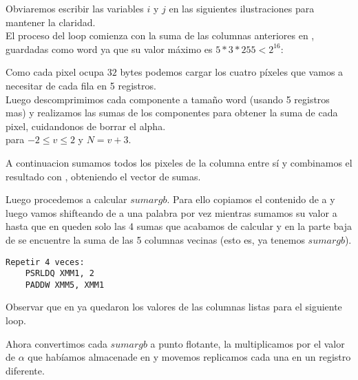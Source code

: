 Obviaremos escribir las variables $i$ y $j$ en las siguientes ilustraciones para mantener la claridad. \\

El proceso del loop comienza con la suma de las columnas anteriores en , guardadas como word ya que su valor máximo es $5 * 3 * 255 < 2^{16}$: \\

 

Como cada pixel ocupa $32$ bytes podemos cargar los cuatro píxeles que vamos a necesitar de cada fila en 5 registros. \\
Luego descomprimimos cada componente a tamaño word (usando 5 registros mas) y realizamos las sumas de los componentes para obtener la suma de cada pixel, cuidandonos de borrar el alpha. \\

  para $-2 \le v \le 2$ y $N = v+3$.

A continuacion sumamos todos los pixeles de la columna entre sí y combinamos el resultado con , obteniendo el vector de sumas. \\

 

Luego procedemos a calcular $sumargb$. Para ello copiamos el contenido de  a  y luego vamos shifteando  de a una palabra por vez mientras sumamos su valor a  hasta que en  queden solo las 4 sumas que acabamos de calcular y en la parte baja de  se encuentre la suma de las 5 columnas vecinas (esto es, ya tenemos $sumargb$).

\begin{lstlisting}
Repetir 4 veces:
    PSRLDQ XMM1, 2
    PADDW XMM5, XMM1
\end{lstlisting}

 

 

Observar que en  ya quedaron los valores de las columnas listas para el siguiente loop.

Ahora convertimos cada $sumargb$ a punto flotante, la multiplicamos por el valor de $\alpha$ que habíamos almacenade en  y movemos replicamos cada una en un registro diferente. \\

